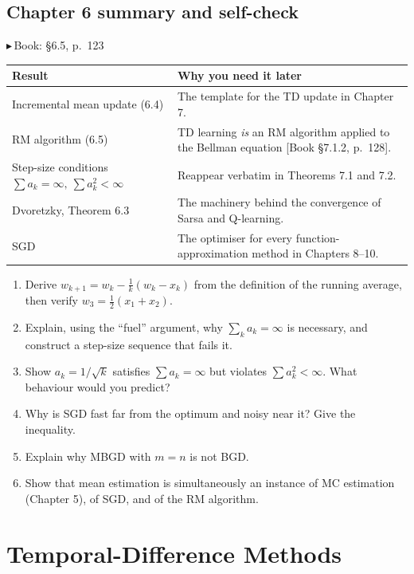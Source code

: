 \documentclass[11pt, letterpaper]{article}
\theoremstyle{runin}
\theoremstyle{runinplain}
\theoremstyle{remark}
\newcommand{\bk}[1]{{\color{bookblue}\small$\blacktriangleright$\,\textsf{Book: #1}}}
\newcommand{\bkin}[1]{{\color{bookblue}\small[\textsf{Book #1}]}}
\begin{document}
\subsection{Chapter 6 summary and self-check}

\bk{\S6.5, p.~123}

\begin{center}
\small
\begin{tabular}{@{}lp{}@{}}
\toprule
Result & Why you need it later \\
\midrule
Incremental mean update (6.4) & The template for the TD update in Chapter 7. \\
RM algorithm (6.5) & TD learning \emph{is} an RM algorithm applied to the Bellman equation \bkin{\S7.1.2, p.~128}. \\
Step-size conditions $\sum a_k=\infty,\ \sum a_k^2<\infty$ & Reappear verbatim in Theorems 7.1 and 7.2. \\
Dvoretzky, Theorem 6.3 & The machinery behind the convergence of Sarsa and Q-learning. \\
SGD & The optimiser for every function-approximation method in Chapters 8--10. \\
\bottomrule
\end{tabular}
\end{center}

\begin{enumerate}
  \item Derive $w_{k+1}=w_k-\frac1k(w_k-x_k)$ from the definition of the running
        average, then verify $w_3=\frac12(x_1+x_2)$.
  \item Explain, using the ``fuel'' argument, why $\sum_k a_k=\infty$ is necessary,
        and construct a step-size sequence that fails it.
  \item Show $a_k=1/\sqrt k$ satisfies $\sum a_k=\infty$ but violates
        $\sum a_k^2<\infty$. What behaviour would you predict?
  \item Why is SGD fast far from the optimum and noisy near it? Give the inequality.
  \item Explain why MBGD with $m=n$ is not BGD.
  \item Show that mean estimation is simultaneously an instance of MC estimation
        (Chapter 5), of SGD, and of the RM algorithm.
\end{enumerate}

\newpage
\section{Temporal-Difference Methods}
\end{document}
